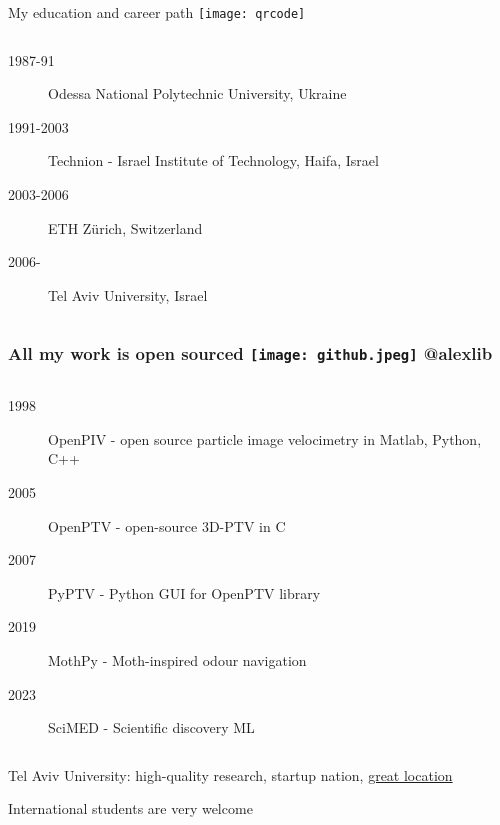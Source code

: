 \begin{frame}[label=intro-1]{My education and career path \hfill \texttt{[image: qrcode]}}
\begin{columns}
\begin{column}{.7\textwidth}
\begin{card}
\begin{description}
\item[1987-91] Odessa National Polytechnic University, Ukraine
\item[1991-2003] Technion - Israel Institute of Technology, Haifa, Israel
\item[2003-2006] ETH Z\"{u}rich, Switzerland
\item[2006-] Tel Aviv University, Israel
\end{description}
\end{card}
\end{column}


\end{columns}
\end{frame}
%


\begin{frame}[label=intro-2]
\frametitle{ All my work is open sourced \hfill \texttt{[image: github.jpeg]} @alexlib }
\begin{columns}
\begin{column}{.7\textwidth}
\begin{card}
\begin{description}
\item[1998] OpenPIV - open source particle image velocimetry in Matlab, Python, C++
\item[2005] OpenPTV - open-source 3D-PTV in C
\item[2007] PyPTV - Python GUI for OpenPTV library
\item[2019] MothPy - Moth-inspired odour navigation
\item[2023] SciMED - Scientific discovery ML
\end{description}
\end{card}
\end{column}
\begin{column}{.3\textwidth}
\end{column}
\end{columns}
\end{frame}

\begin{frame}[label=intro-3]{Tel Aviv University: high-quality research, startup nation, \href{https://www.youtube.com/watch?v=3SD_XlUyncw}{great location }}
\begin{multicols}{2}
\centering
{} 
\end{multicols}
\end{frame}


\begin{frame}[label=intro-4]{International students are very welcome}
\begin{columns}
\end{columns}
\end{frame}
